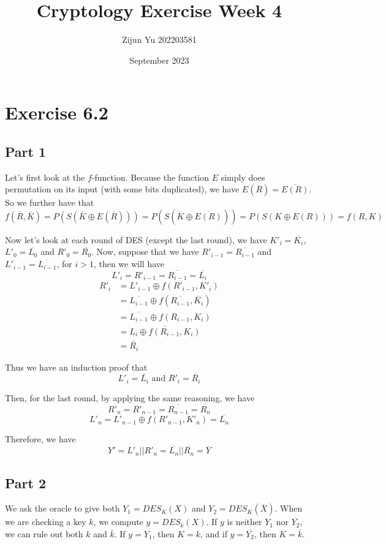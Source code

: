 \documentclass{article}
\title{Cryptology Exercise Week 4}
\author{Zijun Yu 202203581}
\date{September 2023}
\begin{document}
\maketitle

\section*{Exercise 6.2}

\subsection*{Part 1}

Let's first look at the $f$-function. Because the function $E$ simply
does permutation on its input (with some bits duplicated), we have
$E(\overline{R}) = \overline{E(R)}$. So we further have that
$$
    f(\overline{R}, \overline{K}) = P(S(\overline{K} \oplus E(\overline{R})))
    = P(S(\overline{K} \oplus \overline{E(R)})) = P(S(K \oplus E(R))) = f(R,K)
$$

Now let's look at each round of DES (except the last round), we have
$K'_i = \overline{K_i}$, $L'_0 = \overline{L_0}$ and $R'_0 = \overline{R_0}$.
Now, suppose that we have
$R'_{i-1} = \overline{R_{i-1}}$ and $L'_{i-1} = \overline{L_{i-1}}$,
for $i>1$, then we will have
$$L'_i = R'_{i-1} = \overline{R_{i-1}} = \overline{L_i}$$
\begin{equation*}
    \begin{split}
        R'_i & = L'_{i-1} \oplus f(R'_{i-1}, K'_i) \\
        & = \overline{L_{i-1}} \oplus f(\overline{R_{i-1}}, \overline{K_i}) \\
        & = \overline{L_{i-1}} \oplus f(R_{i-1}, K_i) \\
        & = \overline{L_i \oplus f(R_{i-1}, K_i)} \\
        & = \overline{R_i}
    \end{split}
\end{equation*}

Thus we have an induction proof that
$$
    L'_i = \overline{L_i} \text{ and } R'_i = \overline{R_i}
$$

Then, for the last round, by applying the same reasoning, we have
$$
    R'_{n} = R'_{n-1} = \overline{R_{n-1}} = \overline{R_n}
$$
$$
    L'_{n} = L'_{n-1} \oplus f(R'_{n-1}, K'_n) = \overline{L_{n}}
$$

Therefore, we have
$$
    Y' = L'_n || R'_n = \overline{L_n} || \overline{R_n} = \overline{Y}
$$

\subsection*{Part 2}

We ask the oracle to give both $Y_1 = DES_K(X)$ and $Y_2 = DES_K(\overline{X})$.
When we are checking a key $k$, we compute $y = DES_k(X)$. If $y$
is neither $Y_1$ nor $\overline{Y_2}$, we can rule out both $k$ and $\overline{k}$.
If $y = Y_1$, then $K=k$, and if $y=\overline{Y_2}$, then $K=\overline{k}$.
\end{document}
